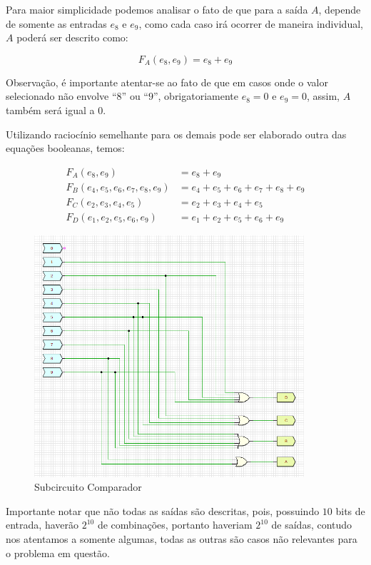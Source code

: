\documentclass[12pt]{article}
\begin{document}
Para maior simplicidade podemos analisar o fato de que para a saída
\textbf{$A$}, depende de somente as entradas $e_{8}$ e $e_{9}$, como cada caso
irá ocorrer de maneira individual, \textbf{$A$} poderá ser descrito como:

\begin{equation}
F_{A}(e_{8}, e_{9}) = e_{8} + e_{9}
\end{equation}

Observação, é importante atentar-se ao fato de que em casos onde o valor
selecionado não envolve ``$8$'' ou ``$9$'', obrigatoriamente $e_{8}=0$ e
$e_{9}=0$, assim, \textbf{$A$} também será igual a $0$.

Utilizando raciocínio semelhante para os demais pode ser elaborado outra das
equações booleanas, temos:

\begin{align}
F_{A}(e_{8}, e_{9}) &= e_{8} + e_{9} \\
F_{B}(e_{4},e_{5},e_{6},e_{7},e_{8},e_{9}) &= e_{4}+e_{5}+e_{6}+e_{7}+e_{8}+e_{9} \\
F_{C}(e_{2},e_{3},e_{4},e_{5}) &= e_{2}+e_{3}+e_{4}+e_{5} \\
F_{D}(e_{1},e_{2},e_{5},e_{6},e_{9}) &= e_{1}+e_{2}+e_{5}+e_{6}+e_{9}
\end{align}

\begin{figure}[H]
    \centering
    \includegraphics[width=10cm]{Exp05/2.1.png}
    \caption{Subcircuito Comparador}
    \label{fig:subComparador2.1}
\end{figure}

Importante notar que não todas as saídas são descritas, pois, possuindo $10$
bits de entrada, haverão $2^{10}$ de combinações, portanto haveriam $2^{10}$ de
saídas, contudo nos atentamos a somente algumas, todas as outras são casos não
relevantes para o problema em questão.
\end{document}
